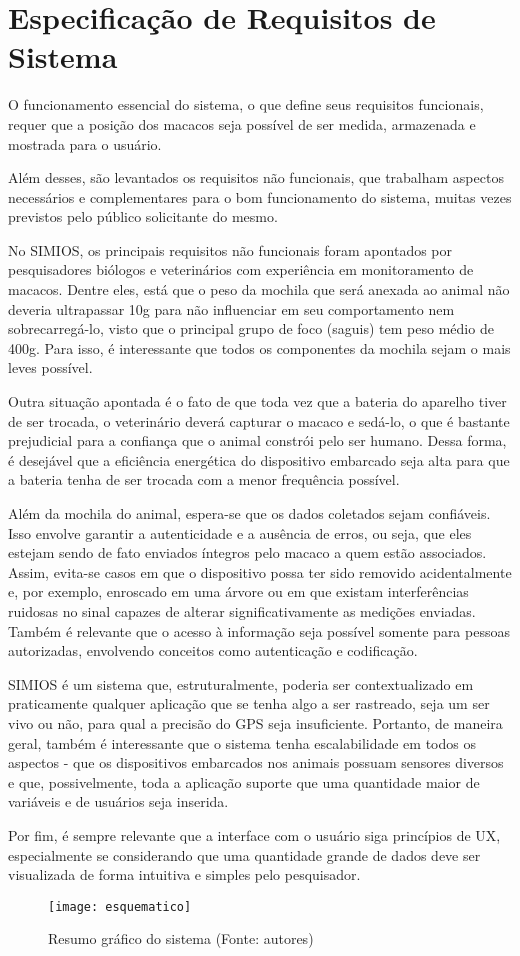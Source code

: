 \chapter{Especificação de Requisitos de Sistema}
O funcionamento essencial do sistema, o que define seus requisitos funcionais, requer que a posição dos macacos seja possível de ser medida, armazenada e mostrada para o usuário.

Além desses, são levantados os requisitos não funcionais, que trabalham aspectos necessários e complementares para o bom funcionamento do sistema, muitas vezes previstos pelo público solicitante do mesmo.

No SIMIOS, os principais requisitos não funcionais foram apontados por pesquisadores biólogos e veterinários com experiência em monitoramento de macacos. Dentre eles, está que o peso da mochila que será anexada ao animal não deveria ultrapassar 10g para não influenciar em seu comportamento nem sobrecarregá-lo, visto que o principal grupo de foco (saguis) tem peso médio de 400g. Para isso, é interessante que todos os componentes da mochila sejam o mais leves possível.

Outra situação apontada é o fato de que toda vez que a bateria do aparelho tiver de ser trocada, o veterinário deverá capturar o macaco e sedá-lo, o que é bastante prejudicial para a confiança que o animal constrói pelo ser humano. Dessa forma, é desejável que a eficiência energética do dispositivo embarcado seja alta para que a bateria tenha de ser trocada com a menor frequência possível.

Além da mochila do animal, espera-se que os dados coletados sejam confiáveis. Isso envolve garantir a autenticidade e a ausência de erros, ou seja, que eles estejam sendo de fato enviados íntegros pelo macaco a quem estão associados. Assim, evita-se casos em que o dispositivo possa ter sido removido acidentalmente e, por exemplo, enroscado em uma árvore ou em que existam interferências ruidosas no sinal capazes de alterar significativamente as medições enviadas. Também é relevante que o acesso à informação seja possível somente para pessoas autorizadas, envolvendo conceitos como autenticação e codificação.

SIMIOS é um sistema que, estruturalmente, poderia ser contextualizado em praticamente qualquer aplicação que se tenha algo a ser rastreado, seja um ser vivo ou não, para qual a precisão do GPS seja insuficiente. Portanto, de maneira geral, também é interessante que o sistema tenha escalabilidade em todos os aspectos - que os dispositivos embarcados nos animais possuam sensores diversos e que, possivelmente, toda a aplicação suporte que uma quantidade maior de variáveis e de usuários seja inserida.

Por fim, é sempre relevante que a interface com o usuário siga princípios de UX, especialmente se considerando que uma quantidade grande de dados deve ser visualizada de forma intuitiva e simples pelo pesquisador.

\begin{figure}[ht]
  \centering
    \texttt{[image: esquematico]}
  \caption{Resumo gráfico do sistema (Fonte: autores)}
\end{figure}
\FloatBarrier